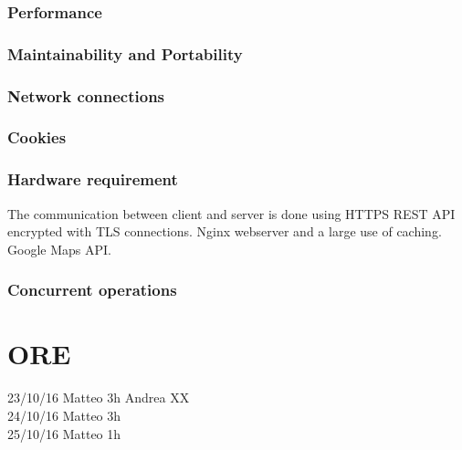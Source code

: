 \documentclass[english]{article}
\newcounter{requirement}
\begin{document}
\pagebreak{}




\subsubsection{Performance}


\subsubsection{Maintainability and Portability}

\pagebreak{}




\subsubsection{Network connections}


\subsubsection{Cookies}



\subsubsection{Hardware requirement}
The communication between client and server is done using HTTPS REST API encrypted with TLS connections.
Nginx webserver and a large use of caching.
Google Maps API.



\subsubsection{Concurrent operations}

\section{ORE}
23/10/16 
Matteo 3h 
Andrea XX\\
24/10/16 
Matteo 3h\\
25/10/16 
Matteo 1h\\
\end{document}
